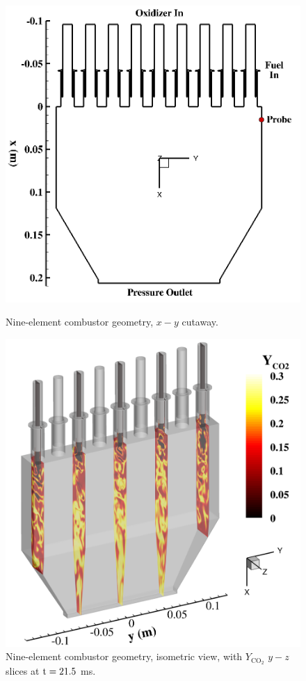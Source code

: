\begin{figure}
	\begin{minipage}{0.49\linewidth}
		\includegraphics[width=0.99\linewidth]{Chapters/HPROMResults/Images/nineElem/geom_xy.png}
		\caption{\label{fig:nineElemGeomXY}Nine-element combustor geometry, $x-y$ cutaway.}
	\end{minipage}
	\begin{minipage}{0.49\linewidth}
		\includegraphics[width=0.99\linewidth]{Chapters/HPROMResults/Images/nineElem/geom_iso.png}
		\caption{\label{fig:nineElemGeomIso}Nine-element combustor geometry, isometric view, with $Y_{\text{CO}_2}$ $y-z$ slices at $\text{t} = 21.5$ ms.}
	\end{minipage}
\end{figure}

